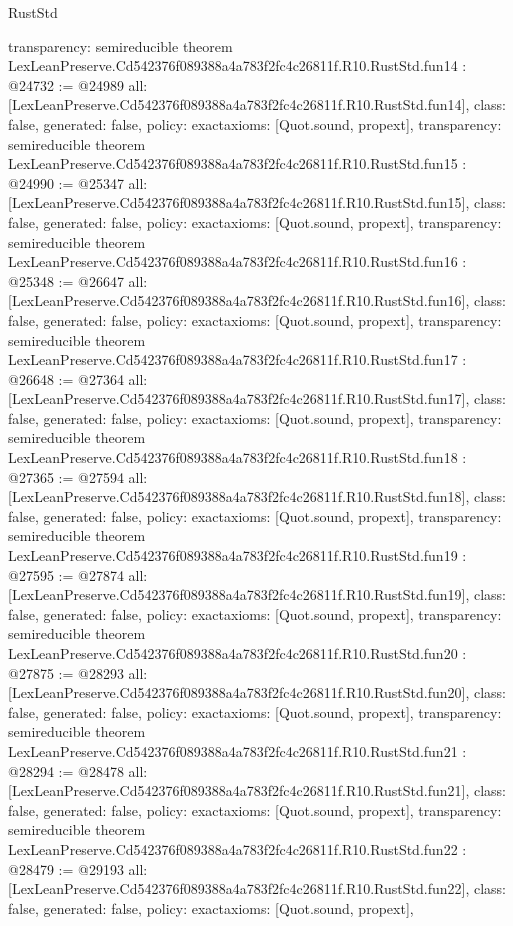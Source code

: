 \begin{lexlean}{RustStd}
\begin{coremodule}
{  transparency: semireducible
}
theorem LexLeanPreserve.Cd542376f089388a4a783f2fc4c26811f.R10.RustStd.fun14 : @24732 := @24989 {
  all: [LexLeanPreserve.Cd542376f089388a4a783f2fc4c26811f.R10.RustStd.fun14],
  class: false,
  generated: false,
  policy: exact{axioms: [Quot.sound, propext]},
  transparency: semireducible
}
theorem LexLeanPreserve.Cd542376f089388a4a783f2fc4c26811f.R10.RustStd.fun15 : @24990 := @25347 {
  all: [LexLeanPreserve.Cd542376f089388a4a783f2fc4c26811f.R10.RustStd.fun15],
  class: false,
  generated: false,
  policy: exact{axioms: [Quot.sound, propext]},
  transparency: semireducible
}
theorem LexLeanPreserve.Cd542376f089388a4a783f2fc4c26811f.R10.RustStd.fun16 : @25348 := @26647 {
  all: [LexLeanPreserve.Cd542376f089388a4a783f2fc4c26811f.R10.RustStd.fun16],
  class: false,
  generated: false,
  policy: exact{axioms: [Quot.sound, propext]},
  transparency: semireducible
}
theorem LexLeanPreserve.Cd542376f089388a4a783f2fc4c26811f.R10.RustStd.fun17 : @26648 := @27364 {
  all: [LexLeanPreserve.Cd542376f089388a4a783f2fc4c26811f.R10.RustStd.fun17],
  class: false,
  generated: false,
  policy: exact{axioms: [Quot.sound, propext]},
  transparency: semireducible
}
theorem LexLeanPreserve.Cd542376f089388a4a783f2fc4c26811f.R10.RustStd.fun18 : @27365 := @27594 {
  all: [LexLeanPreserve.Cd542376f089388a4a783f2fc4c26811f.R10.RustStd.fun18],
  class: false,
  generated: false,
  policy: exact{axioms: [Quot.sound, propext]},
  transparency: semireducible
}
theorem LexLeanPreserve.Cd542376f089388a4a783f2fc4c26811f.R10.RustStd.fun19 : @27595 := @27874 {
  all: [LexLeanPreserve.Cd542376f089388a4a783f2fc4c26811f.R10.RustStd.fun19],
  class: false,
  generated: false,
  policy: exact{axioms: [Quot.sound, propext]},
  transparency: semireducible
}
theorem LexLeanPreserve.Cd542376f089388a4a783f2fc4c26811f.R10.RustStd.fun20 : @27875 := @28293 {
  all: [LexLeanPreserve.Cd542376f089388a4a783f2fc4c26811f.R10.RustStd.fun20],
  class: false,
  generated: false,
  policy: exact{axioms: [Quot.sound, propext]},
  transparency: semireducible
}
theorem LexLeanPreserve.Cd542376f089388a4a783f2fc4c26811f.R10.RustStd.fun21 : @28294 := @28478 {
  all: [LexLeanPreserve.Cd542376f089388a4a783f2fc4c26811f.R10.RustStd.fun21],
  class: false,
  generated: false,
  policy: exact{axioms: [Quot.sound, propext]},
  transparency: semireducible
}
theorem LexLeanPreserve.Cd542376f089388a4a783f2fc4c26811f.R10.RustStd.fun22 : @28479 := @29193 {
  all: [LexLeanPreserve.Cd542376f089388a4a783f2fc4c26811f.R10.RustStd.fun22],
  class: false,
  generated: false,
  policy: exact{axioms: [Quot.sound, propext]},
}
\end{coremodule}
\end{lexlean}
